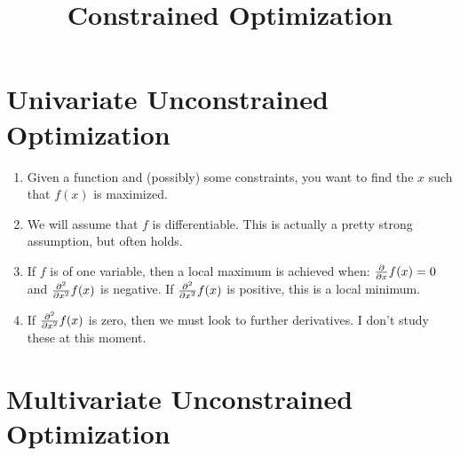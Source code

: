 \documentclass[11pt, oneside]{amsart}
\begin{document}
\title{Constrained Optimization}
\maketitle

\section{Univariate Unconstrained Optimization}

\begin{enumerate}
  \item  Given a function and (possibly) some constraints, you want to
  find the $x$ such that $f(x)$ is maximized.

  \item We will assume that $f$ is differentiable. This is actually a
  pretty strong assumption, but often holds.

  \item If $f$ is of one variable, then a local maximum is achieved
  when: $\frac{\partial }{\partial x} f(x)=0$ and $\frac{\partial^2 }{\partial {x}^2} f(x)$ is negative. If
  $\frac{\partial^2 }{\partial {x}^2} f(x)$ is positive, this is a local minimum.

  \item If $\frac{\partial^2 }{\partial {x}^2} f(x)$ is zero, then we must look to further
  derivatives. I don't study these at this moment.
\end{enumerate}

\section{Multivariate Unconstrained Optimization}
\end{document}
